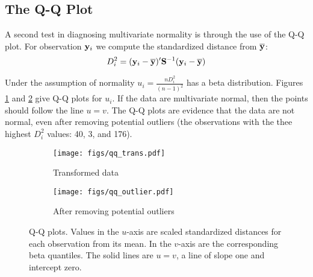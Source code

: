 \subsection{The Q-Q Plot}

A second test in diagnosing multivariate normality is through the use of the Q-Q plot. For observation $\mathbf{\bm{y}}_i$ we compute the standardized distance from $\overline{\mathbf{\bm{y}}}$:
\[D_i^2 = (\mathbf{\bm{y}}_i-\overline{\mathbf{\bm{y}}})'\mathbf{\bm{S}}^{-1}(\mathbf{\bm{y}}_i-\overline{\mathbf{\bm{y}}}) \]

Under the assumption of normality $u_i=\frac{nD_i^2}{(n-1)^2}$ has a beta distribution. Figures \ref{qq_trans} and \ref{qq_outlier} give Q-Q plots for $u_i$. If the data are multivariate normal, then the points should follow the line $u=v$. The Q-Q plots are evidence that the data are not normal, even after removing potential outliers (the observations with the thee highest $D_i^2$ values: 40, 3, and 176).

\begin{figure}
    \centering
    \begin{subfigure}{.5\textwidth}
        \centering
        \texttt{[image: figs/qq\_trans.pdf]}
        \caption{Transformed data}
        \label{qq_trans}
    \end{subfigure}%
    \begin{subfigure}{.5\textwidth}
        \centering
        \texttt{[image: figs/qq\_outlier.pdf]}
        \caption{After removing potential outliers}
        \label{qq_outlier}
    \end{subfigure}
    \caption{Q-Q plots. Values in the $u$-axis are scaled standardized distances for each observation from its mean. In the $v$-axis are the corresponding beta quantiles. The solid lines are $u=v$, a line of slope one and intercept zero.}
    \label{qq_both}
\end{figure}
